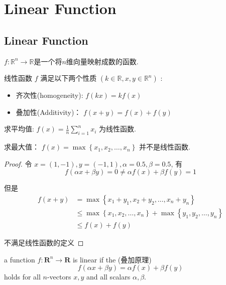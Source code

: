 \chapter{Linear Function}

\section{Linear Function}

\begin{definition}
    $f: \mathbb{R}^{n} \rightarrow \mathbb{R}$是一个将$n$维向量映射成数的函数. 

    线性函数 $ f $ 满足以下两个性质 $ \left(k \in \mathbb{R}, x, y \in \mathbb{R}^{n}\right) $ :

    \begin{itemize}
        \item 齐次性(homogeneity): $ f(k x)=k f(x) $
        \item 叠加性(Additivity)： $ f(x+y)=f(x)+f(y) $
    \end{itemize}
\end{definition}

\begin{example}
    求平均值: $ f(x)=\frac{1}{n} \sum_{i=1}^{n} x_{i} $ 为线性函数. 
\end{example}

\begin{example}
    求最大值： $ f(x)=\max \left\{x_{1}, x_{2}, \ldots, x_{n}\right\} $ 并不是线性函数. 
\end{example}

\begin{proof}
   令 $ x=(1,-1), y=(-1,1), \alpha=0.5, \beta=0.5 $, 
   有 $$ f(\alpha x+\beta y)=0 \neq \alpha f(x)+\beta f(y)=1 $$

    但是
   $$ \begin{aligned} f(x+y) 
    &=\max \left\{x_{1}+y_{1}, x_{2}+y_{2}, \ldots, x_{n}+y_{n}\right\} 
    \\ & \leq \max \left\{x_{1}, x_{2}, \ldots, x_{n}\right\}+\max \left\{y_{1}, y_{2}, \ldots, y_{n}\right\} 
    \\ & \leq f(x)+f(y) \end{aligned} $$

    不满足线性函数的定义
\end{proof}

\begin{theorem}
        a function $ f: \mathbf{R}^{n} \rightarrow \mathbf{R} $ is linear if the  (叠加原理)
    $$
    f(\alpha x+\beta y)=\alpha f(x)+\beta f(y)
    $$
    holds for all $ n $-vectors $ x, y $ and all scalars $ \alpha, \beta $.
    
\end{theorem}

